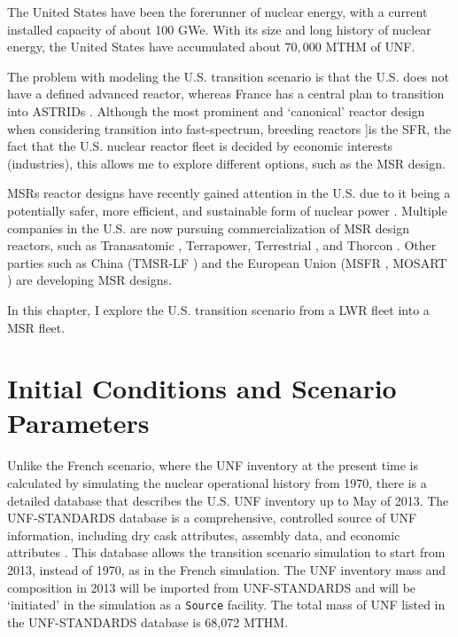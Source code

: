 
The United States have been the forerunner of nuclear energy, with a current
installed capacity of about 100 GWe. With its size and long history of nuclear
energy, the United States have accumulated about $70,000$ \gls{MTHM} of \gls{UNF}.

The problem with modeling the U.S. transition scenario is that the U.S. does not have
a defined advanced reactor, whereas France has a central plan to transition into \glspl{ASTRID} \cite{boullis_french_2015, varaine_pre-conceptual_2012}.
Although the most prominent and `canonical' reactor design when considering
transition into fast-spectrum, breeding reactors ]is the \gls{SFR},
the fact that the U.S. nuclear reactor fleet
is decided by economic interests (industries), this allows me to explore
different options, such as the \gls{MSR} design.

\glspl{MSR} reactor designs have recently gained attention in the U.S. due to it being a
potentially safer, more efficient, and sustainable form of nuclear power
\cite{serp_molten_2014}. Multiple companies in the U.S. are now pursuing
commercialization of \gls{MSR} design reactors, such as Tranasatomic \cite{transatomic_power_corporation_technical_2016}
, Terrapower, Terrestrial \cite{leblanc_18_2017}, and
Thorcon \cite{jorgensen_19_2017}. Other parties such as China (TMSR-LF \cite{dai_17_2017}) 
and the European Union (MSFR \cite{heuer_towards_2014}, MOSART \cite{ignatiev_molten_2014})
are developing \gls{MSR} designs.

In this chapter, I explore the U.S. transition scenario
from a \gls{LWR} fleet into a \gls{MSR} fleet.

\section{Initial Conditions and Scenario Parameters}
Unlike the French scenario,
where the \gls{UNF} inventory at the present time is calculated by
simulating the nuclear operational history from 1970, there is a
detailed database that describes the U.S. \gls{UNF} inventory up to May of 2013.
The \gls{UNF-STANDARDS} database is a comprehensive,
controlled source of \gls{UNF} information, including dry cask attributes, assembly
data, and economic attributes \cite{peterson_unf-st&dards_2017}. This database
allows the transition scenario simulation to start from 2013, instead of 1970,
as in the French simulation. The \gls{UNF} inventory mass and composition in 2013
will be imported from \gls{UNF-STANDARDS} and will be `initiated' in the simulation
as a \texttt{Source} facility. The total mass of \gls{UNF} listed
in the \gls{UNF-STANDARDS} database is 68,072 MTHM.

